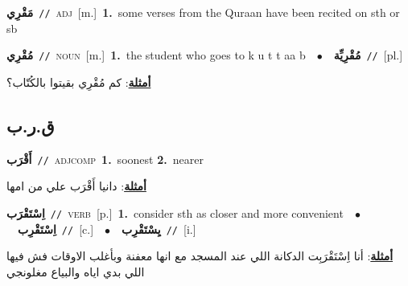 \documentclass[10pt,a4paper,twoside]{article} %
\begin{document}
\begin{multicols}{2}
{\setlength\topsep{0pt}\textbf{\foreignlanguage{arabic}{مَقْرِي}}\ {\color{gray}\texttt{//}\color{black}}\ \textsc{adj}\ [m.]\ \textbf{1.}~some verses from the Quraan have been recited on sth or sb\ } \vspace{2mm}

{\setlength\topsep{0pt}\textbf{\foreignlanguage{arabic}{مُقْرِي}}\ {\color{gray}\texttt{//}\color{black}}\ \textsc{noun}\ [m.]\ \textbf{1.}~the student who goes to k u t t aa b\ \ $\bullet$\ \ \setlength\topsep{0pt}\textbf{\foreignlanguage{arabic}{مُقْرِيِّة}}\ {\color{gray}\texttt{//}\color{black}}\ [pl.]\  \begin{flushright}\color{gray}\foreignlanguage{arabic}{\textbf{\underline{\foreignlanguage{arabic}{أمثلة}}}: كم مُقْرِي بقيتوا بالكُتّاب؟}\end{flushright}\color{black}} \vspace{2mm}

\vspace{-3mm}
\subsection*{\color{blue}\foreignlanguage{arabic}{ق.ر.ب}\color{blue}{}} 

{\setlength\topsep{0pt}\textbf{\foreignlanguage{arabic}{أَقْرَب}}\ {\color{gray}\texttt{//}\color{black}}\ \textsc{adj\textunderscore comp}\ \textbf{1.}~soonest  \textbf{2.}~nearer\  \begin{flushright}\color{gray}\foreignlanguage{arabic}{\textbf{\underline{\foreignlanguage{arabic}{أمثلة}}}: دانيا أَقْرَب علي من امها}\end{flushright}\color{black}} \vspace{2mm}

{\setlength\topsep{0pt}\textbf{\foreignlanguage{arabic}{اِسْتَقْرَب}}\ {\color{gray}\texttt{//}\color{black}}\ \textsc{verb}\ [p.]\ \textbf{1.}~consider sth as closer and more convenient\ \ $\bullet$\ \ \setlength\topsep{0pt}\textbf{\foreignlanguage{arabic}{اِسْتَقْرِب}}\ {\color{gray}\texttt{//}\color{black}}\ [c.]\ \ $\bullet$\ \ \setlength\topsep{0pt}\textbf{\foreignlanguage{arabic}{يِسْتَقْرِب}}\ {\color{gray}\texttt{//}\color{black}}\ [i.]\  \begin{flushright}\color{gray}\foreignlanguage{arabic}{\textbf{\underline{\foreignlanguage{arabic}{أمثلة}}}: أنا اِسْتَقْرَبِت الدكانة اللي عند المسجد مع انها معفنة وبأغلب الاوقات فش فيها اللي بدي اياه والبياع مغلونجي}\end{flushright}\color{black}} \vspace{2mm}


\end{multicols}
\end{document}
